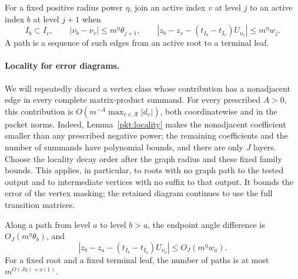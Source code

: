 For a fixed positive radius power \(\eta\), join an active index \(v\)
at level \(j\) to an active index \(b\) at level \(j+1\) when
\begin{equation}\label{eq:source-35}
 I_b\subset I_v,\qquad
 |\nu_b-\nu_v|\leq m^\eta\theta_{j+1},\qquad
 |z_b-z_v-(t_{I_b}-t_{I_v})U_{\nu_v}|\leq m^\eta w_j .
\end{equation}
A path is a sequence of such edges from an active root to a terminal
leaf.

\paragraph{Locality for error diagrams.}\label{ext:diagram-locality}
We will repeatedly discard a vertex class whose contribution has a
nonadjacent edge in every complete matrix-product summand.
For every prescribed \(A>0\), this contribution is
\(O(m^{-A}\max_{v\in\mathcal R}|d_v|)\), both coordinatewise and in
the packet norms. Indeed, Lemma~\ref{pkt:locality} makes the
nonadjacent coefficient smaller than any prescribed negative power;
the remaining coefficients and the number of summands have polynomial
bounds, and there are only \(J\) layers. Choose the locality decay
order after the graph radius and these fixed family bounds.
This applies, in particular, to roots with no graph path to the tested
output and to intermediate vertices with no suffix to that output.
It bounds the error of the vertex masking; the retained diagram
continues to use the full transition matrices.

\begin{lemma}\label{ext:endpoints}
Along a path from level \(a\) to level \(b>a\), the endpoint angle
difference is \(O_J(m^\eta\theta_b)\), and
\[
 |z_b-z_a-(t_{I_b}-t_{I_a})U_{\nu_a}|
       \leq O_J(m^\eta w_a).
\]
For a fixed root and a fixed terminal leaf, the number of paths is
at most \(m^{O(J\eta)+o(1)}\).
\end{lemma}

